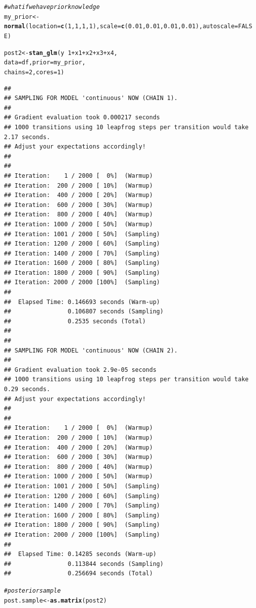 \documentclass[11pt,a4paper,twoside]{book}
\makeatletter
\newcommand{\hlnum}[1]{\textcolor[rgb]{0.686,0.059,0.569}{#1}}%
\newcommand{\hlcom}[1]{\textcolor[rgb]{0.678,0.584,0.686}{\textit{#1}}}%
\newcommand{\hlopt}[1]{\textcolor[rgb]{0,0,0}{#1}}%
\newcommand{\hlstd}[1]{\textcolor[rgb]{0.345,0.345,0.345}{#1}}%
\newcommand{\hlkwb}[1]{\textcolor[rgb]{0.69,0.353,0.396}{#1}}%
\newcommand{\hlkwc}[1]{\textcolor[rgb]{0.333,0.667,0.333}{#1}}%
\newcommand{\hlkwd}[1]{\textcolor[rgb]{0.737,0.353,0.396}{\textbf{#1}}}%
\newenvironment{kframe}{%
 \def\at@end@of@kframe{}%
 \ifinner\ifhmode%
  \def\at@end@of@kframe{\end{minipage}}%
  \begin{minipage}{\columnwidth}%
 \fi\fi%
 \def\FrameCommand##1{\hskip\@totalleftmargin \hskip-\fboxsep
 \colorbox{shadecolor}{##1}\hskip-\fboxsep
     \hskip-\linewidth \hskip-\@totalleftmargin \hskip\columnwidth}%
 \MakeFramed {\advance\hsize-\width
   \@totalleftmargin\z@ \linewidth\hsize
   \@setminipage}}%
 {\par\unskip\endMakeFramed%
 \at@end@of@kframe}
\newenvironment{knitrout}{}{} %
\makeatother
\begin{document}
\begin{knitrout}
\begin{kframe}
\begin{alltt}
\hlcom{#what if we have prior knowledge}
\hlstd{my_prior} \hlkwb{<-} \hlkwd{normal}\hlstd{(}\hlkwc{location} \hlstd{=} \hlkwd{c}\hlstd{(}\hlnum{1}\hlstd{,} \hlnum{1}\hlstd{,}\hlnum{1}\hlstd{,}\hlnum{1}\hlstd{),} \hlkwc{scale} \hlstd{=} \hlkwd{c}\hlstd{(}\hlnum{0.01}\hlstd{,} \hlnum{0.01}\hlstd{,}\hlnum{0.01}\hlstd{,}\hlnum{0.01}\hlstd{),} \hlkwc{autoscale} \hlstd{=} \hlnum{FALSE}\hlstd{)}

\hlstd{post2} \hlkwb{<-} \hlkwd{stan_glm}\hlstd{(y} \hlopt{~} \hlnum{1} \hlopt{+} \hlstd{x1} \hlopt{+} \hlstd{x2} \hlopt{+} \hlstd{x3} \hlopt{+} \hlstd{x4,}
                  \hlkwc{data} \hlstd{= df,} \hlkwc{prior} \hlstd{= my_prior,}
                  \hlkwc{chains} \hlstd{=} \hlnum{2}\hlstd{,} \hlkwc{cores} \hlstd{=} \hlnum{1}\hlstd{)}
\end{alltt}
\begin{verbatim}
## 
## SAMPLING FOR MODEL 'continuous' NOW (CHAIN 1).
## 
## Gradient evaluation took 0.000217 seconds
## 1000 transitions using 10 leapfrog steps per transition would take 2.17 seconds.
## Adjust your expectations accordingly!
## 
## 
## Iteration:    1 / 2000 [  0%]  (Warmup)
## Iteration:  200 / 2000 [ 10%]  (Warmup)
## Iteration:  400 / 2000 [ 20%]  (Warmup)
## Iteration:  600 / 2000 [ 30%]  (Warmup)
## Iteration:  800 / 2000 [ 40%]  (Warmup)
## Iteration: 1000 / 2000 [ 50%]  (Warmup)
## Iteration: 1001 / 2000 [ 50%]  (Sampling)
## Iteration: 1200 / 2000 [ 60%]  (Sampling)
## Iteration: 1400 / 2000 [ 70%]  (Sampling)
## Iteration: 1600 / 2000 [ 80%]  (Sampling)
## Iteration: 1800 / 2000 [ 90%]  (Sampling)
## Iteration: 2000 / 2000 [100%]  (Sampling)
## 
##  Elapsed Time: 0.146693 seconds (Warm-up)
##                0.106807 seconds (Sampling)
##                0.2535 seconds (Total)
## 
## 
## SAMPLING FOR MODEL 'continuous' NOW (CHAIN 2).
## 
## Gradient evaluation took 2.9e-05 seconds
## 1000 transitions using 10 leapfrog steps per transition would take 0.29 seconds.
## Adjust your expectations accordingly!
## 
## 
## Iteration:    1 / 2000 [  0%]  (Warmup)
## Iteration:  200 / 2000 [ 10%]  (Warmup)
## Iteration:  400 / 2000 [ 20%]  (Warmup)
## Iteration:  600 / 2000 [ 30%]  (Warmup)
## Iteration:  800 / 2000 [ 40%]  (Warmup)
## Iteration: 1000 / 2000 [ 50%]  (Warmup)
## Iteration: 1001 / 2000 [ 50%]  (Sampling)
## Iteration: 1200 / 2000 [ 60%]  (Sampling)
## Iteration: 1400 / 2000 [ 70%]  (Sampling)
## Iteration: 1600 / 2000 [ 80%]  (Sampling)
## Iteration: 1800 / 2000 [ 90%]  (Sampling)
## Iteration: 2000 / 2000 [100%]  (Sampling)
## 
##  Elapsed Time: 0.14285 seconds (Warm-up)
##                0.113844 seconds (Sampling)
##                0.256694 seconds (Total)
\end{verbatim}
\begin{alltt}
\hlcom{#posterior sample}
\hlstd{post.sample} \hlkwb{<-} \hlkwd{as.matrix}\hlstd{(post2)}


\end{alltt}
\end{kframe}
\end{knitrout}
\end{document}
